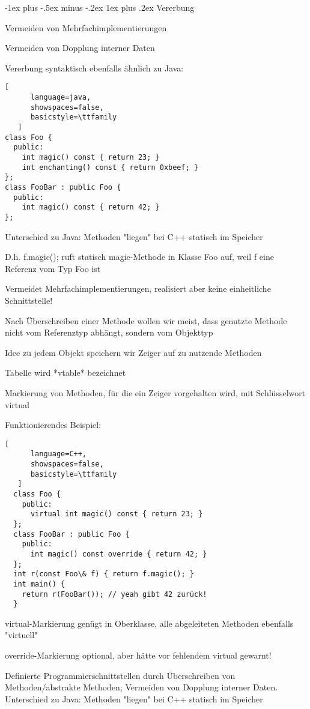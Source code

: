 \documentclass[10pt]{article}
\makeatletter
\renewcommand{\subsubsection}{\@startsection{subsubsection}{3}{0mm}%
                                {-1ex plus -.5ex minus -.2ex}%
                                {1ex plus .2ex}%
                                {\normalfont\small\bfseries}}
\makeatother
\begin{document}
\subsubsection{Vererbung}
\begin{itemize*}
  \item Vermeiden von Mehrfachimplementierungen
  \item Vermeiden von Dopplung interner Daten
  \item Vererbung syntaktisch ebenfalls ähnlich zu Java:
  \begin{lstlisting}[
      language=java,
      showspaces=false,
      basicstyle=\ttfamily
   ]
class Foo {
  public:
    int magic() const { return 23; }
    int enchanting() const { return 0xbeef; }
};
class FooBar : public Foo {
  public:
    int magic() const { return 42; }
};
\end{lstlisting}
\end{itemize*}

\begin{itemize*}
  \item Unterschied zu Java: Methoden "liegen" bei C++ statisch im Speicher
  \begin{itemize*}
    \item D.h. f.magic(); ruft statisch magic-Methode in Klasse Foo auf, weil f eine Referenz vom Typ Foo ist
    \item Vermeidet Mehrfachimplementierungen, realisiert aber keine einheitliche Schnittstelle!
  \end{itemize*}
  \item Nach Überschreiben einer Methode wollen wir meist, dass genutzte Methode nicht vom Referenztyp abhängt, sondern vom Objekttyp
  \begin{itemize*}
    \item Idee zu jedem Objekt speichern wir Zeiger auf zu nutzende Methoden
    \item Tabelle wird *vtable* bezeichnet
    \item Markierung von Methoden, für die ein Zeiger vorgehalten wird, mit Schlüsselwort virtual
    \item Funktionierendes Beispiel:
    \begin{lstlisting}[
      language=C++,
      showspaces=false,
      basicstyle=\ttfamily
   ]
  class Foo {
    public:
      virtual int magic() const { return 23; }
  };
  class FooBar : public Foo {
    public:
      int magic() const override { return 42; }
  };
  int r(const Foo\& f) { return f.magic(); }
  int main() {
    return r(FooBar()); // yeah gibt 42 zurück!
  }
  \end{lstlisting}
    \item virtual-Markierung genügt in Oberklasse, alle abgeleiteten Methoden ebenfalls "virtuell"
    \item override-Markierung optional, aber hätte vor fehlendem virtual gewarnt!
  \end{itemize*}
\end{itemize*}
Definierte Programmierschnittstellen durch Überschreiben von Methoden/abstrakte Methoden; Vermeiden von Dopplung interner Daten.
Unterschied zu Java: Methoden "liegen" bei C++ statisch im Speicher
\end{document}
